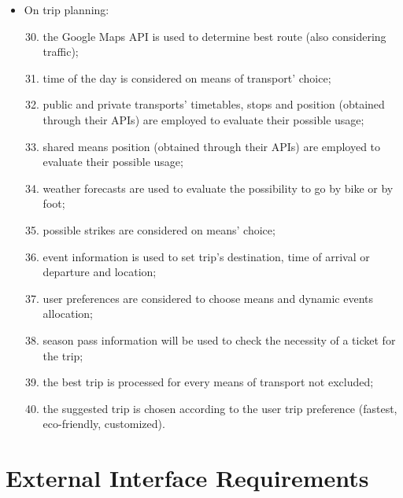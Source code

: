 \begin{itemize}
\item	On trip planning:
\begin{enumerate}
  \setcounter{enumi}{29}
\item	the Google Maps API is used to determine best route (also considering traffic);
\item	time of the day is considered on means of transport’ choice;
\item	public and private transports’ timetables, stops and position (obtained through their APIs) are employed to evaluate their possible usage;
\item	shared means position (obtained through their APIs) are employed to evaluate their possible usage;
\item	weather forecasts are used to evaluate the possibility to go by bike or by foot;
\item	possible strikes are considered on means’ choice;
\item	event information is used to set trip’s destination, time of arrival or departure and location;
\item	user preferences are considered to choose means and dynamic events allocation;
\item	season pass information will be used to check the necessity of a ticket for the trip;
\item	the best trip is processed for every means of transport not excluded;
\item	the suggested trip is chosen according to the user trip preference (fastest, eco-friendly, customized).
\end{enumerate}
\end{itemize}
%
%
\section{External Interface Requirements}
